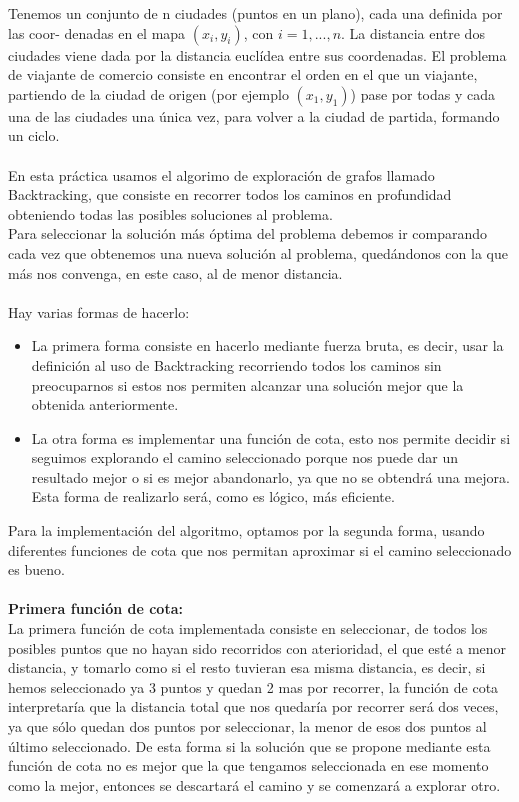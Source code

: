 \documentclass[11pt,openany]{book}
\begin{document}
Tenemos un conjunto de n ciudades (puntos en un plano), cada una definida por las coor-
denadas en el mapa $(x_i , y_i )$, con $i = 1, . . . , n$. La distancia entre dos ciudades viene dada por la
distancia euclídea entre sus coordenadas.
El problema de viajante de comercio consiste en encontrar el orden en el que un viajante,
partiendo de la ciudad de origen (por ejemplo $(x_1 , y_1 )$) pase por todas y cada una de las ciudades
una única vez, para volver a la ciudad de partida, formando un ciclo. \
\\ \\       
En esta práctica usamos el algorimo de exploración de grafos llamado Backtracking, que consiste en recorrer todos los caminos en profundidad obteniendo todas
las posibles soluciones al problema. \\
Para seleccionar la solución más óptima del problema debemos ir comparando cada vez que obtenemos una nueva solución al problema, quedándonos con la que más nos
convenga, en este caso, al de menor distancia.
\\ \\
Hay varias formas de hacerlo:
\begin{itemize}
      \item La primera forma consiste en hacerlo mediante fuerza bruta, es decir, usar la definición al uso de Backtracking recorriendo todos los caminos sin preocuparnos
      si estos nos permiten alcanzar una solución mejor que la obtenida anteriormente.
      \item La otra forma es implementar una función de cota, esto nos permite decidir si seguimos explorando el camino seleccionado porque nos puede dar un resultado mejor
      o si es mejor abandonarlo, ya que no se obtendrá una mejora.
      Esta forma de realizarlo será, como es lógico, más eficiente.
\end{itemize}

Para la implementación del algoritmo, optamos por la segunda forma, usando diferentes funciones de cota que nos permitan aproximar si el camino seleccionado es bueno. \\ \\

\textbf{Primera función de cota:} \\
La primera función de cota implementada consiste en seleccionar, de todos los posibles puntos  que no hayan sido recorridos con aterioridad, el que esté a menor distancia, y tomarlo como si el resto tuvieran esa misma distancia,
es decir, si hemos seleccionado ya 3 puntos y quedan 2 mas por recorrer, la función de cota interpretaría que la distancia total que nos quedaría por recorrer será dos veces, ya que sólo quedan dos puntos por seleccionar, la menor de esos dos puntos al último seleccionado.
De esta forma si la solución que se propone mediante esta función de cota no es mejor que la que tengamos seleccionada en ese momento como la mejor, entonces se descartará el camino y se comenzará a explorar otro.
\end{document}
